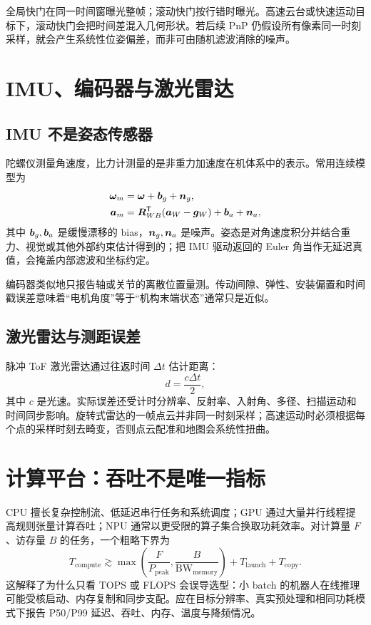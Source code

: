 全局快门在同一时间窗曝光整帧；滚动快门按行错时曝光。高速云台或快速运动目标下，滚动快门会把时间差混入几何形状。若后续 PnP 仍假设所有像素同一时刻采样，就会产生系统性位姿偏差，而非可由随机滤波消除的噪声。

\section{IMU、编码器与激光雷达}

\subsection{IMU 不是姿态传感器}

陀螺仪测量角速度，比力计测量的是非重力加速度在机体系中的表示。常用连续模型为
\begin{align}
  \bm{\omega}_m &= \bm{\omega}+\bm{b}_g+\bm{n}_g,\\
  \bm{a}_m &= \bm{R}_{WB}^{\mathsf T}(\bm{a}_W-\bm{g}_W)+\bm{b}_a+\bm{n}_a,
\end{align}
其中 $\bm{b}_g,\bm{b}_a$ 是缓慢漂移的 bias，$\bm{n}_g,\bm{n}_a$ 是噪声。姿态是对角速度积分并结合重力、视觉或其他外部约束估计得到的；把 IMU 驱动返回的 Euler 角当作无延迟真值，会掩盖内部滤波和坐标约定。

编码器类似地只报告轴或关节的离散位置量测。传动间隙、弹性、安装偏置和时间戳误差意味着“电机角度”等于“机构末端状态”通常只是近似。

\subsection{激光雷达与测距误差}

脉冲 ToF 激光雷达通过往返时间 $\Delta t$ 估计距离：
\begin{equation}
  d=\frac{c\Delta t}{2},
\end{equation}
其中 $c$ 是光速。实际误差还受计时分辨率、反射率、入射角、多径、扫描运动和时间同步影响。旋转式雷达的一帧点云并非同一时刻采样；高速运动时必须根据每个点的采样时刻去畸变，否则点云配准和地图会系统性扭曲。

\section{计算平台：吞吐不是唯一指标}

CPU 擅长复杂控制流、低延迟串行任务和系统调度；GPU 通过大量并行线程提高规则张量计算吞吐；NPU 通常以更受限的算子集合换取功耗效率。对计算量 $F$、访存量 $B$ 的任务，一个粗略下界为
\begin{equation}
  T_{\mathrm{compute}} \gtrsim
  \max\!\left(\frac{F}{P_{\mathrm{peak}}},\frac{B}{\mathrm{BW}_{\mathrm{memory}}}\right)
  +T_{\mathrm{launch}}+T_{\mathrm{copy}}.
\end{equation}
这解释了为什么只看 TOPS 或 FLOPS 会误导选型：小 batch 的机器人在线推理可能受核启动、内存复制和同步支配。应在目标分辨率、真实预处理和相同功耗模式下报告 P50/P99 延迟、吞吐、内存、温度与降频情况。

